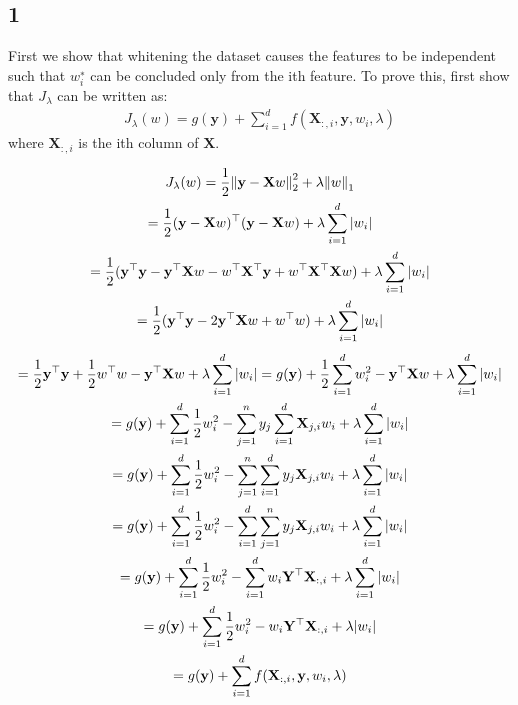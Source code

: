 \documentclass[12pt]{article}
\begin{document}
\subsection{1}
First we show that whitening the dataset causes the features to be independent such that $w^{∗}_{i}$ can be concluded only from the ith feature. To prove this, first show that $J_λ$ can be written as:
\begin{gather*}
    J_{\lambda}(w) = g(\mathbf{y}) + \sum_{i=1}^{d} f(\mathbf{X}_{:,i} , \mathbf{y} ,w_i ,\lambda )
\end{gather*}
where $\mathbf{X}_{:,i}$ is the ith column of $\mathbf{X}$.
\begin{qsolve}
    \begin{gather*}
        J_{\lambda}(w) = \frac{1}{2} \norm{\mathbf{y} - \mathbf{X}w}_{2}^{2} + \lambda \norm{w}_1\\
        = \frac{1}{2} (\mathbf{y} - \mathbf{X}w)^\top (\mathbf{y} - \mathbf{X}w) + \lambda \sum_{i=1}^{d} \abs{w_i}\\
        = \frac{1}{2} (\mathbf{y}^\top \mathbf{y} - \mathbf{y}^\top \mathbf{X}w - w^\top \mathbf{X}^\top \mathbf{y} + w^\top \mathbf{X}^\top \mathbf{X}w) + \lambda \sum_{i=1}^{d} \abs{w_i}\\
        = \frac{1}{2} (\mathbf{y}^\top \mathbf{y} - 2\mathbf{y}^\top \mathbf{X}w + w^\top w) + \lambda \sum_{i=1}^{d} \abs{w_i}\\
    \end{gather*}
    \splitqsolve
    \begin{gather*}
        = \frac{1}{2} \mathbf{y}^\top \mathbf{y} + \frac{1}{2} w^\top w - \mathbf{y}^\top \mathbf{X}w + \lambda \sum_{i=1}^{d} \abs{w_i} = g(\mathbf{y}) + \frac{1}{2} \sum_{i=1}^{d} w_i^2 - \mathbf{y}^\top \mathbf{X}w + \lambda \sum_{i=1}^{d} \abs{w_i}\\
        = g(\mathbf{y}) + \sum_{i=1}^{d} \frac{1}{2} w_i^2 -\sum_{j=1}^{n} y_j \sum_{i=1}^{d} \mathbf{X}_{j,i} w_i + \lambda \sum_{i=1}^{d} \abs{w_i}\\
        = g(\mathbf{y}) + \sum_{i=1}^{d} \frac{1}{2} w_i^2 -\sum_{j=1}^{n} \sum_{i=1}^{d} y_j \mathbf{X}_{j,i} w_i + \lambda \sum_{i=1}^{d} \abs{w_i}\\
        = g(\mathbf{y}) + \sum_{i=1}^{d} \frac{1}{2} w_i^2 -\sum_{i=1}^{d} \sum_{j=1}^{n} y_j \mathbf{X}_{j,i} w_i + \lambda \sum_{i=1}^{d} \abs{w_i}\\
        = g(\mathbf{y}) + \sum_{i=1}^{d} \frac{1}{2} w_i^2 -\sum_{i=1}^{d} w_i \mathbf{Y}^\top \mathbf{X}_{:,i} + \lambda \sum_{i=1}^{d} \abs{w_i}\\
        = g(\mathbf{y}) + \sum_{i=1}^{d} \frac{1}{2} w_i^2 -w_{i} \mathbf{Y}^\top \mathbf{X}_{:,i} + \lambda \abs{w_i}\\
        = g(\mathbf{y}) + \sum_{i=1}^{d} f(\mathbf{X}_{:,i} , \mathbf{y} ,w_i ,\lambda )
    \end{gather*}
\end{qsolve}
\end{document}
